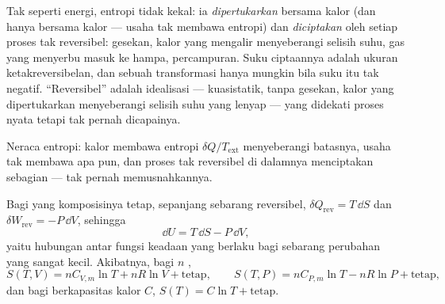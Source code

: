 \begin{remark}\label{rem:b1:second-law-entropy:reading}
Tak seperti energi, entropi tidak kekal: ia \emph{dipertukarkan} bersama kalor
(dan hanya bersama kalor --- usaha tak membawa entropi) dan \emph{diciptakan} oleh
setiap proses tak reversibel: gesekan, kalor yang mengalir menyeberangi selisih
suhu, gas yang menyerbu masuk ke hampa, percampuran. Suku ciptaannya adalah
ukuran ketakreversibelan, dan sebuah transformasi hanya mungkin bila
suku itu tak negatif. ``Reversibel'' adalah idealisasi --- kuasistatik,
tanpa gesekan, kalor yang dipertukarkan menyeberangi selisih suhu yang lenyap --- yang
didekati proses nyata tetapi tak pernah dicapainya.
\end{remark}

\begin{omfigure}

{\small Neraca entropi: kalor membawa entropi $\delta Q/T_{\mathrm{ext}}$
menyeberangi batasnya, usaha tak membawa apa pun, dan proses tak reversibel di dalamnya
menciptakan sebagian --- tak pernah memusnahkannya.}
\end{omfigure}

\begin{proposition}\label{prop:b1:second-law-entropy:identity}
Bagi  yang komposisinya tetap, sepanjang sebarang  reversibel,
$\delta Q_{\mathrm{rev}} = T\,\dd S$ dan $\delta W_{\mathrm{rev}} = -P\,\dd V$, sehingga
\[
\dd U = T\,\dd S - P\,\dd V ,
\]
yaitu hubungan antar fungsi keadaan yang berlaku bagi sebarang perubahan
yang sangat kecil. Akibatnya, bagi $n$  ,
\[
S(T, V) = nC_{V,m}\ln T + nR\ln V + \text{tetap}, \qquad
S(T, P) = nC_{P,m}\ln T - nR\ln P + \text{tetap},
\]
dan bagi  berkapasitas kalor $C$, $S(T) = C\ln T + \text{tetap}$.
\end{proposition}

